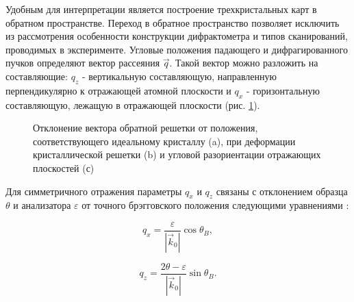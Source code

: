 Удобным для интерпретации является построение трехкристальных карт в обратном пространстве.
Переход в обратное пространство позволяет исключить из рассмотрения особенности
конструкции дифрактометра и типов сканирований, проводимых в эксперименте.
 Угловые положения падающего и дифрагированного пучков
определяют вектор рассеяния $\vec{q}$. Такой вектор можно разложить на составляющие:
$q_z$ - вертикальную составляющую,
направленную перпендикулярно к отражающей атомной плоскости и $q_x$ - горизонтальную составляющую,
лежащую в отражающей плоскости (рис. \ref{ris:q_vector_reciprocal_space}).

\begin{figure}[H]
  \centering
  \hfill
  \hfill
  \caption{Отклонение вектора обратной решетки от положения, соответствующего идеальному кристаллу (a),
  при деформации кристаллической решетки (b) и угловой разориентации отражающих плоскостей (с) }
  \label{ris:q_vector_reciprocal_space}
\end{figure}

Для симметричного отражения параметры $q_x$ и $q_z$ связаны с отклонением образца $\theta$ и
анализатора $\varepsilon$ от точного брэгговского положения следующими
уравнениями \cite{Tanner_1998}:

\begin{equation}
  q_x = \frac{\varepsilon}{|\vec{k}_0|} \cos \theta_B,
  \label{eq:qx_eqn}
\end{equation}

\begin{equation}
  q_z = \frac{2\theta - \varepsilon}{|\vec{k}_0|} \sin \theta_B.
  \label{eq:qz_eqn}
\end{equation}

